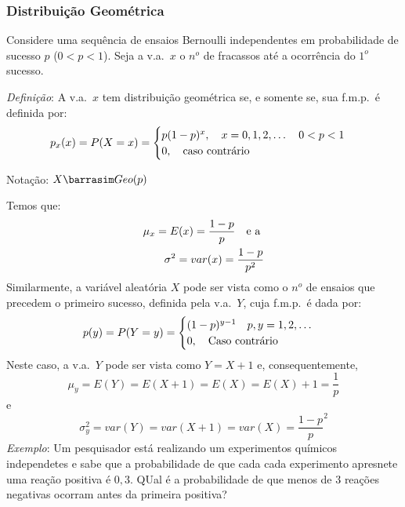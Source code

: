 \documentclass[11pt,a4paper]{book}
\begin{document}
\begin{enumerate}[label=(\alph*)]
\begin{enumerate}
\subsubsection{Distribuição Geométrica}
Considere uma sequência de ensaios Bernoulli independentes em probabilidade de 
sucesso $p$ ($0<p<1$). Seja a v.a.\ $x$ o $n^o$ de fracassos até a ocorrência 
do $1^o$ sucesso. 

\emph{Definição}: A v.a.\ $x$ tem distribuição geométrica se, e somente se, sua 
f.m.p.\ é definida por: 
\begin{align}
  p_{x}(x)=P(X=x)=\begin{cases}
    p(1-p)^x, \text{\quad }x=0,1,2,\dots \text{\quad}0<p<1\\
    0, \text{\quad caso contrário}
  \end{cases}
\end{align}
\begin{center}Notação: $X \barrasim Geo(p)$\end{center}
Temos que:
\begin{align}
  \mu_{x}=E(x)=\frac{1-p}{p} \text{\quad e a }\\
  \sigma^2 = var(x)=\frac{1-p}{p^2}
\end{align}
Similarmente, a variável aleatória $X$ pode ser vista como o $n^o$ de ensaios que
precedem o primeiro sucesso, definida pela v.a.\ $Y$, cuja f.m.p.\ é dada por:
\begin{align*}
  p(y)=P(Y=y)=\begin{cases}
    (1-p)^{y-1} \text{\quad }p,y=1,2,\dots \\
    0, \text{\quad Caso contrário}
  \end{cases}
\end{align*}
Neste caso, a v.a.\ $Y$ pode ser vista como $Y=X+1$ e, consequentemente,
$$\mu_y=E(Y)=E(X+1)=E(X)=E(X)+1= \frac{1}{p}$$ 
e
$$\sigma_y^2=var(Y)=var(X+1)=var(X)= \frac{1-p}{p}^2$$ 
\emph{Exemplo}: Um pesquisador está realizando um experimentos químicos independetes 
e sabe que a probabilidade de que cada cada experimento apresnete uma reação 
positiva é $0,3$. QUal é a probabilidade de que menos de 3 reações negativas 
ocorram antes da primeira positiva?


\end{enumerate}
\end{enumerate}
\end{document}
